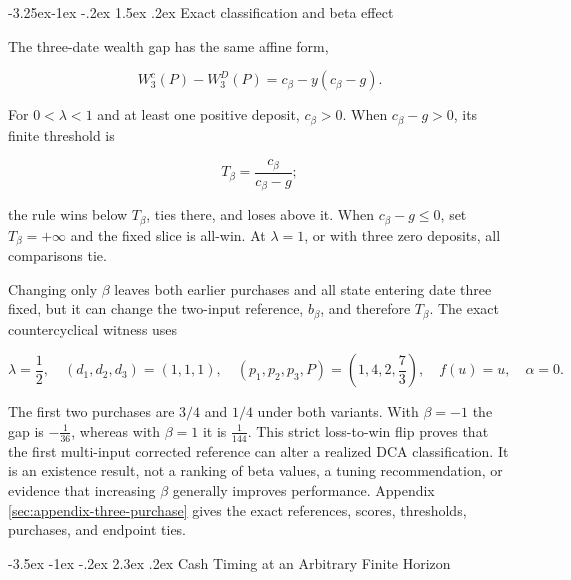 \documentclass[12pt,a4paper,oneside]{report}
\makeatletter
\renewcommand\section{\@startsection{section}{1}{\z@}%
  {-3.5ex \@plus -1ex \@minus -.2ex}%
  {2.3ex \@plus .2ex}%
  {\normalfont\fontsize{14}{17}\selectfont\bfseries}}
\renewcommand\subsection{\@startsection{subsection}{2}{\z@}%
  {-3.25ex\@plus -1ex \@minus -.2ex}%
  {1.5ex \@plus .2ex}%
  {\normalfont\fontsize{12}{15}\selectfont\bfseries}}
\makeatother
\begin{document}
\subsection{Exact classification and beta effect}
\label{thm:three-purchase}

The three-date wealth gap has the same affine form,

\begin{equation}
  \boxed{W_3^c(P)-W_3^D(P)=c_\beta-y(c_\beta-g).}
  \label{eq:three-purchase-boundary}
\end{equation}

For $0<\lambda<1$ and at least one positive deposit, $c_\beta>0$. When
$c_\beta-g>0$, its finite threshold is

\begin{equation}
  T_\beta=\frac{c_\beta}{c_\beta-g};
  \label{eq:three-purchase-threshold}
\end{equation}

the rule wins below $T_\beta$, ties there, and loses above it. When
$c_\beta-g\leq0$, set $T_\beta=+\infty$ and the fixed slice is all-win.
At $\lambda=1$, or with three zero deposits, all comparisons tie.

Changing only $\beta$ leaves both earlier purchases and all state entering
date three fixed, but it can change the two-input reference, $b_\beta$, and
therefore $T_\beta$. The exact countercyclical witness uses

\begin{equation}
  \lambda=\frac12,\quad(d_1,d_2,d_3)=(1,1,1),\quad
  (p_1,p_2,p_3,P)=\left(1,4,2,\frac73\right),\quad
  f(u)=u,\quad\alpha=0.
  \label{eq:three-purchase-witness-inputs}
\end{equation}

The first two purchases are $3/4$ and $1/4$ under both variants. With
$\beta=-1$ the gap is $-\frac{1}{36}$, whereas with $\beta=1$ it is
$\frac{1}{144}$. This strict loss-to-win flip proves that the first
multi-input corrected reference can alter a realized DCA classification. It
is an existence result, not a ranking of beta values, a tuning recommendation,
or evidence that increasing $\beta$ generally improves performance. Appendix
\ref{sec:appendix-three-purchase} gives the exact references, scores,
thresholds, purchases, and endpoint ties.

\section{Cash Timing at an Arbitrary Finite Horizon}
\label{sec:cash-timing}
\end{document}
